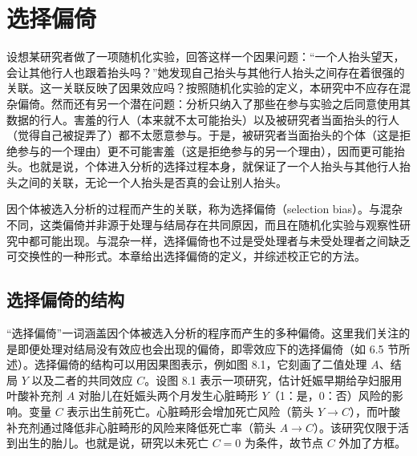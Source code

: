 \chapter{选择偏倚}


\renewcommand{\topfraction}{0.92}
\renewcommand{\bottomfraction}{0.85}
\renewcommand{\textfraction}{0.06}
\renewcommand{\floatpagefraction}{0.60}
\setcounter{topnumber}{3}
\setcounter{bottomnumber}{2}
\setcounter{totalnumber}{4}

设想某研究者做了一项随机化实验，回答这样一个因果问题：“一个人抬头望天，会让其他行人也跟着抬头吗？”她发现自己抬头与其他行人抬头之间存在着很强的关联。这一关联反映了因果效应吗？按照随机化实验的定义，本研究中不应存在混杂偏倚。然而还有另一个潜在问题：分析只纳入了那些在参与实验之后同意使用其数据的行人。害羞的行人（本来就不太可能抬头）以及被研究者当面抬头的行人（觉得自己被捉弄了）都不太愿意参与。于是，被研究者当面抬头的个体（这是拒绝参与的一个理由）更不可能害羞（这是拒绝参与的另一个理由），因而更可能抬头。也就是说，个体进入分析的选择过程本身，就保证了一个人抬头与其他行人抬头之间的关联，无论一个人抬头是否真的会让别人抬头。

因个体被选入分析的过程而产生的关联，称为选择偏倚（selection bias）。与混杂不同，这类偏倚并非源于处理与结局存在共同原因，而且在随机化实验与观察性研究中都可能出现。与混杂一样，选择偏倚也不过是受处理者与未受处理者之间缺乏可交换性的一种形式。本章给出选择偏倚的定义，并综述校正它的方法。

\section{选择偏倚的结构}

“选择偏倚”一词涵盖因个体被选入分析的程序而产生的多种偏倚。这里我们关注的是即便处理对结局没有效应也会出现的偏倚，即零效应下的选择偏倚（如 6.5 节所述）。选择偏倚的结构可以用因果图表示，例如图 8.1，它刻画了二值处理 $A$、结局 $Y$ 以及二者的共同效应 $C$。设图 8.1 表示一项研究，估计妊娠早期给孕妇服用叶酸补充剂 $A$ 对胎儿在妊娠头两个月发生心脏畸形 $Y$（1：是，0：否）风险的影响。变量 $C$ 表示出生前死亡。心脏畸形会增加死亡风险（箭头 $Y\to C$），而叶酸补充剂通过降低非心脏畸形的风险来降低死亡率（箭头 $A\to C$）。该研究仅限于活到出生的胎儿。也就是说，研究以未死亡 $C=0$ 为条件，故节点 $C$ 外加了方框。

\begin{figure}[htbp]
\centering
{}
\caption{}
\label{fig:8.1}
\end{figure}

